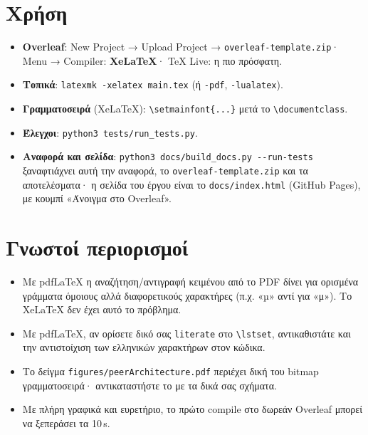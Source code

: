 \documentclass[a4paper,11pt]{article}
\begin{document}
\section{Χρήση}
\begin{itemize}
	\item \textbf{Overleaf}: New Project → Upload Project → \texttt{overleaf-template.zip}·
		Menu → Compiler: \textbf{XeLaTeX}· TeX Live: η πιο πρόσφατη.
	\item \textbf{Τοπικά}: \verb|latexmk -xelatex main.tex| (ή \verb|-pdf|, \verb|-lualatex|).
	\item \textbf{Γραμματοσειρά} (XeLaTeX): \verb|\setmainfont{...}| μετά το \verb|\documentclass|.
	\item \textbf{Έλεγχοι}: \verb|python3 tests/run_tests.py|.
	\item \textbf{Αναφορά και σελίδα}: \verb|python3 docs/build_docs.py --run-tests|
		ξαναφτιάχνει αυτή την αναφορά, το \texttt{overleaf-template.zip} και τα
		αποτελέσματα· η σελίδα του έργου είναι το \texttt{docs/index.html}
		(GitHub Pages), με κουμπί «Άνοιγμα στο Overleaf».
\end{itemize}

\section{Γνωστοί περιορισμοί}
\begin{itemize}
	\item Με pdfLaTeX η αναζήτηση/αντιγραφή κειμένου από το PDF δίνει για
		ορισμένα γράμματα όμοιους αλλά διαφορετικούς χαρακτήρες (π.χ.
		«µ» αντί για «μ»). Το XeLaTeX δεν έχει αυτό το πρόβλημα.
	\item Με pdfLaTeX, αν ορίσετε δικό σας \texttt{literate} στο
		\verb|\lstset|, αντικαθιστάτε και την αντιστοίχιση των ελληνικών
		χαρακτήρων στον κώδικα.
	\item Το δείγμα \texttt{figures/peerArchitecture.pdf} περιέχει δική του
		bitmap γραμματοσειρά· αντικαταστήστε το με τα δικά σας σχήματα.
	\item Με πλήρη γραφικά και ευρετήριο, το πρώτο compile στο δωρεάν
		Overleaf μπορεί να ξεπεράσει τα 10\,s.
\end{itemize}
\end{document}
